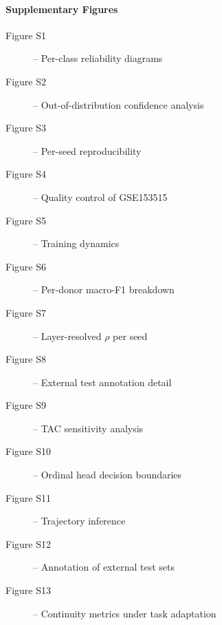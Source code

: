 \documentclass[12pt,a4paper]{article}
\begin{document}
\paragraph*{Supplementary Figures}
\begin{description}
  \item[Figure S1]\hfill\pageref{fig:S1} -- Per-class reliability diagrams
  \item[Figure S2]\hfill\pageref{fig:S2} -- Out-of-distribution confidence analysis
  \item[Figure S3]\hfill\pageref{fig:S3} -- Per-seed reproducibility
  \item[Figure S4]\hfill\pageref{fig:S4} -- Quality control of GSE153515
  \item[Figure S5]\hfill\pageref{fig:S5} -- Training dynamics
  \item[Figure S6]\hfill\pageref{fig:S6} -- Per-donor macro-F1 breakdown
  \item[Figure S7]\hfill\pageref{fig:S7} -- Layer-resolved $\rho$ per seed
  \item[Figure S8]\hfill\pageref{fig:S8} -- External test annotation detail
  \item[Figure S9]\hfill\pageref{fig:S9} -- TAC sensitivity analysis
  \item[Figure S10]\hfill\pageref{fig:S10} -- Ordinal head decision boundaries
  \item[Figure S11]\hfill\pageref{fig:S11} -- Trajectory inference
  \item[Figure S12]\hfill\pageref{fig:S12} -- Annotation of external test sets
  \item[Figure S13]\hfill\pageref{fig:S13} -- Continuity metrics under task adaptation
\end{description}
\end{document}
